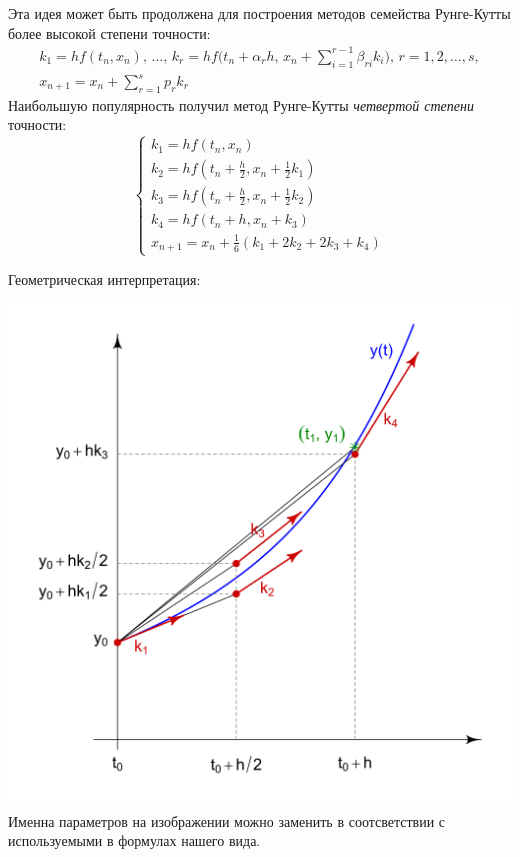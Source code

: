 \documentclass[a4paper,11pt]{article}
\begin{document}
\noindent Эта идея может быть продолжена для построения методов семейства Рунге-Кутты более высокой степени точности:
\begin{gather*}
  k_1 = hf(t_n,x_n), \, \dots, \, k_r = hf \bigg( t_n + \alpha_rh, \, x_n + \sum_{i=1}^{r-1}\beta_{ri}k_i \bigg), \, r=1,2,\dots,s, \\
  \boxed{x_{n+1} = x_n + \sum_{r=1}^s p_rk_r}
\end{gather*}
Наибольшую популярность получил метод Рунге-Кутты \textit{четвертой степени} точности:
\begin{equation}
  \begin{cases}
    k_1 = hf(t_n, x_n) \\
    k_2 = hf(t_n + \frac{h}{2}, x_n + \frac{1}{2}k_1) \\
    k_3 = hf(t_n + \frac{h}{2}, x_n + \frac{1}{2}k_2) \\
    k_4 = hf(t_n + h, x_n + k_3) \\
    x_{n+1} = x_n + \frac{1}{6}(k_1 + 2k_2 + 2k_3 + k_4)
  \end{cases}
  \label{eq:RKM4}
\end{equation}

\vspace{3mm}
\noindent Геометрическая интерпретация:
\begin{center}
  \includegraphics[scale=0.3]{img2.png} \\
  \small
  Именна параметров на изображении можно заменить в соотсветствии с используемыми в формулах нашего вида.
\end{center}
\end{document}
